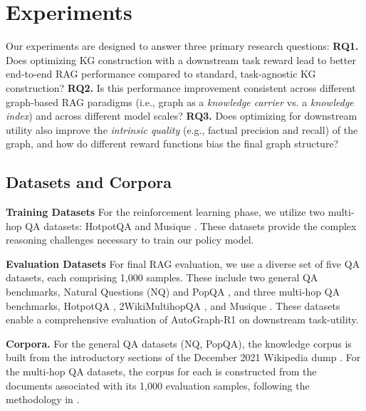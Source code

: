 \documentclass[11pt]{article}
\begin{document}
\section{Experiments}
\label{sec:experiments}
Our experiments are designed to answer three primary research questions: \textbf{RQ1.} Does optimizing KG construction with a downstream task reward lead to better end-to-end RAG performance compared to standard, task-agnostic KG construction? \textbf{RQ2.} Is this performance improvement consistent across different graph-based RAG paradigms (i.e., graph as a \textit{knowledge carrier} vs. a \textit{knowledge index}) and across different model scales? \textbf{RQ3.} Does optimizing for downstream utility also improve the \textit{intrinsic quality} (e.g., factual precision and recall) of the graph, and how do different reward functions bias the final graph structure?
\subsection{Datasets and Corpora}

\textbf{Training Datasets} For the reinforcement learning phase, we utilize two multi-hop QA datasets: HotpotQA \citep{yang_hotpotqa_2018} and Musique \citep{trivedi_musique_2022}. These datasets provide the complex reasoning challenges necessary to train our policy model.

\textbf{Evaluation Datasets} For final RAG evaluation, we use a diverse set of five QA datasets, each comprising 1,000 samples. These include two general QA benchmarks, Natural Questions (NQ) \citep{kwiatkowski_natural_2019} and PopQA \citep{mallen_when_2023}, and three multi-hop QA benchmarks, HotpotQA \citep{yang_hotpotqa_2018}, 2WikiMultihopQA \citep{ho_constructing_2020}, and Musique \citep{trivedi_musique_2022}. These datasets enable a comprehensive evaluation of AutoGraph-R1 on downstream task-utility.

\textbf{Corpora.} For the general QA datasets (NQ, PopQA), the knowledge corpus is built from the introductory sections of the December 2021 Wikipedia dump \citet{izacard_atlas_2022}. For the multi-hop QA datasets, the corpus for each is constructed from the documents associated with its 1,000 evaluation samples, following the methodology in \citet{gutierrez_hipporag_2025}.
\end{document}
